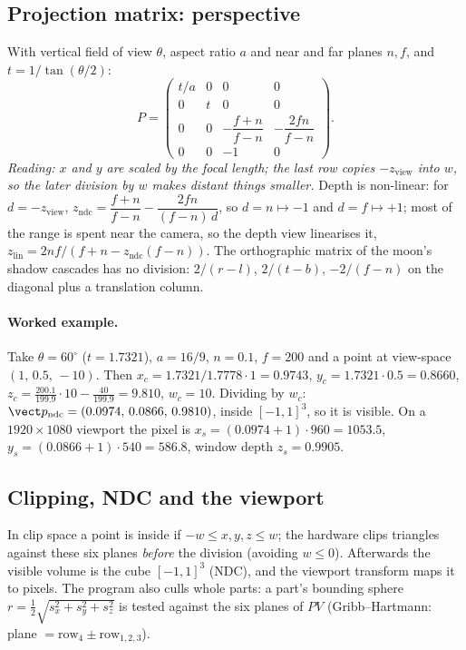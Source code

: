 \subsection{Projection matrix: perspective}
With vertical field of view $\theta$, aspect ratio $a$ and near and far planes $n,f$, and $t=1/\tan(\theta/2)$:
\begin{equation}
P=\begin{pmatrix}t/a&0&0&0\\0&t&0&0\\0&0&-\dfrac{f+n}{f-n}&-\dfrac{2fn}{f-n}\\0&0&-1&0\end{pmatrix}.
\end{equation}
\emph{Reading: $x$ and $y$ are scaled by the focal length; the last row copies $-z_\text{view}$ into $w$, so the later division by $w$ makes distant things smaller.} Depth is non-linear: for $d=-z_\text{view}$,
$z_\text{ndc}=\dfrac{f+n}{f-n}-\dfrac{2fn}{(f-n)\,d}$, so $d=n\mapsto-1$ and $d=f\mapsto+1$; most of the range is spent near the camera, so the depth view linearises it, $z_\text{lin}=2nf/(f+n-z_\text{ndc}(f-n))$. The orthographic matrix of the moon's shadow cascades has no division: $2/(r-l)$, $2/(t-b)$, $-2/(f-n)$ on the diagonal plus a translation column.
\lstPerspective
\paragraph{Worked example.} Take $\theta=60^\circ$ ($t=1.7321$), $a=16/9$, $n=0.1$, $f=200$ and a point at view-space $(1,\,0.5,\,-10)$. Then $x_c=1.7321/1.7778\cdot1=0.9743$, $y_c=1.7321\cdot0.5=0.8660$,
$z_c=\frac{200.1}{199.9}\cdot10-\frac{40}{199.9}=9.810$, $w_c=10$. Dividing by $w_c$: $\vect p_\text{ndc}=(0.0974,\,0.0866,\,0.9810)$, inside $[-1,1]^3$, so it is visible. On a $1920\times1080$ viewport the pixel is $x_s=(0.0974+1)\cdot960=1053.5$,
$y_s=(0.0866+1)\cdot540=586.8$, window depth $z_s=0.9905$.

\subsection{Clipping, NDC and the viewport}
In clip space a point is inside if $-w\le x,y,z\le w$; the hardware clips triangles against these six planes \emph{before} the division (avoiding $w\le0$). Afterwards the visible volume is the cube $[-1,1]^3$ (NDC), and the viewport transform maps it to pixels. The program also culls whole parts: a part's bounding sphere
$r=\tfrac12\sqrt{s_x^2+s_y^2+s_z^2}$ is tested against the six planes of $PV$ (Gribb--Hartmann: plane $=\text{row}_4\pm\text{row}_{1,2,3}$).

